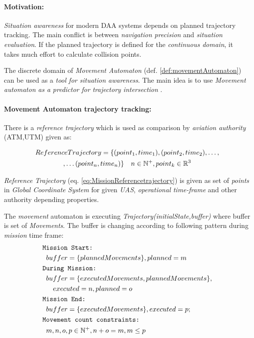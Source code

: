 \paragraph{Motivation:} \emph{Situation awareness} for modern DAA systems depends on planned trajectory tracking. The main conflict is between \emph{navigation precision} and \emph{situation evaluation}. If the planned trajectory is defined for the \emph{continuous domain}, it takes much effort to calculate collision points. 

The discrete domain of \emph{Movement Automaton} (def. \ref{def:movementAutomaton}) can be used as a \emph{tool for situation awareness}. The main idea is to use \emph{Movement automaton as a predictor for trajectory intersection} \cite{frazzoli2000trajectory,frazzoli2001robust}.

\paragraph{Movement Automaton trajectory tracking:} There is a \emph{reference trajectory} which is used as comparison by \emph{aviation authority} (ATM,UTM) given as:

\begin{multline}\label{eq:MissionReferencetrajectory}
    Reference Trajectory = \{(point_1,time_1), (point_2,time_2),\dots,\\,\dots(point_n,time_n)\} \quad n\in\mathbb{N}^+, point_k\in \mathbb{R}^3
\end{multline}

\emph{Reference Trajectory} (eq. \ref{eq:MissionReferencetrajectory}) is given as set of \emph{points} in \emph{Global Coordinate System} for given \emph{UAS}, \emph{operational time-frame} and other authority depending properties.

The \emph{movement} automaton is executing \emph{Trajectory(initialState,buffer)} where buffer is set of \emph{Movements}. The buffer is changing according to following pattern during \emph{mission} time frame:
\begin{equation}\label{eq:BufferEvolutionMission}
    \begin{aligned}
    \texttt{M}&\texttt{ission Start:}\\
    &buffer=\{planned Movements\},planned= m\\
    \texttt{D}&\texttt{uring Mission:}\\
    &buffer=\{executedMovements,plannedMovements\}, \\
    &\quad executed = n, planned =o\\
    \texttt{M}&\texttt{ission End:}\\
    &buffer=\{executedMovements\},executed = p;\\
    \texttt{M}&\texttt{ovement count constraints:}\\
    &m,n,o,p \in \mathbb{N}^+, n+o =m, m\le p
    \end{aligned}
\end{equation}

